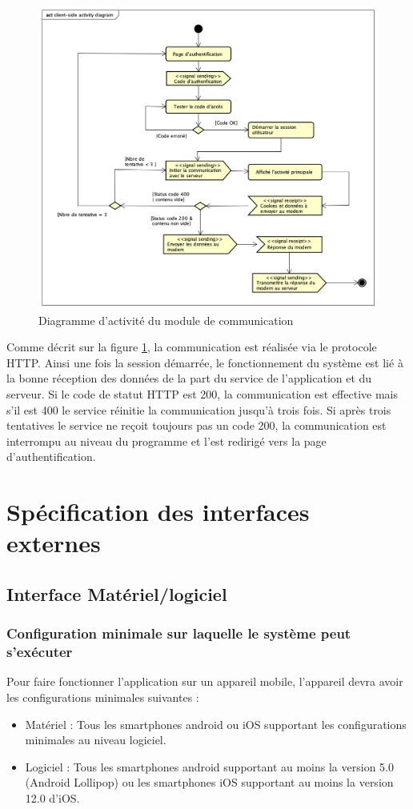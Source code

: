 \begin{figure}[H]
	\centering
	\includegraphics[scale=0.4]{assets/images/client_side_activity_diagram.png}
	\caption{Diagramme d'activité du module de communication}
	\label{fig.7}
\end{figure}
Comme décrit sur la figure \ref{fig.7}, la communication est réalisée via  le protocole HTTP. Ainsi une fois la session démarrée, le fonctionnement du système est lié à la bonne réception des données de la part du service de l'application et du serveur. Si le code de statut HTTP est 200, la communication est effective mais s'il est 400 le service réinitie la communication jusqu'à trois fois. Si après trois tentatives le service ne reçoit toujours pas un code 200, la communication est interrompu au niveau du programme et l'\ut est redirigé vers la page d'authentification.

\section{Spécification des interfaces externes}
\subsection{Interface Matériel/logiciel}
\subsubsection*{Configuration minimale sur laquelle le système peut s'exécuter}
Pour faire fonctionner l'application sur un appareil mobile, l'appareil devra avoir les configurations minimales suivantes :
\begin{itemize}
	\item Matériel : Tous les smartphones android ou iOS supportant les configurations minimales au niveau logiciel.
	\item Logiciel : Tous les smartphones android supportant au moins la version 5.0 (Android Lollipop) ou les smartphones iOS supportant au moins la version 12.0 d'iOS.
\end{itemize}

